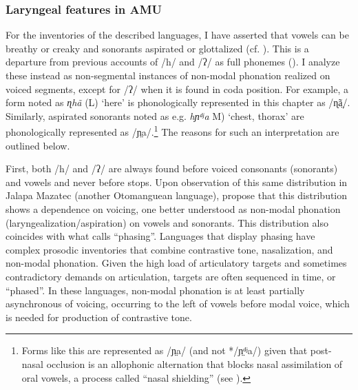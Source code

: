 \documentclass[output=paper]{langscibook}
\begin{document}
\subsubsection{Laryngeal features in AMU}

For the inventories of the described languages, I have asserted that vowels can be breathy or creaky and sonorants aspirated or glottalized (cf. ). This is a departure from previous accounts of /h/ and /ʔ/ as full phonemes (\citealt{Bauernschmidt1965,ApóstolPolanco2014}). I analyze these instead as non-segmental instances of non-modal phonation realized on voiced segments, except for /ʔ/ when it is found in coda position. For example, a form noted as \textit{ɳhã} (L) ‘here’ \citep[302]{Bauernschmidt2010} is phonologically represented in this chapter as /ɳã̤/. Similarly, aspirated sonorants noted as e.g. \textit{hɲᵈʲa} M) ‘chest, thorax’ \citep[127]{Bauernschmidt2010} are phonologically represented as /ɲ̤a/.\footnote{Forms like this are represented as /ɲ̤a/ (and not */ɲ̤ᵈʲa/) given that post-nasal occlusion is an allophonic alternation that blocks nasal assimilation of oral vowels, a process called “nasal shielding” (see \citealt{Dobui2021}).} The reasons for such an interpretation are outlined below.

First, both /h/ and /ʔ/ are always found before voiced consonants (sonorants) and vowels and never before stops. Upon observation of this same distribution in Jalapa Mazatec (another Otomanguean language), \citet{GolstonKehrein1998} propose that this distribution shows a dependence on voicing, one better understood as non-modal phonation (laryngealization\slash aspiration) on vowels and sonorants. This distribution also coincides with what \citet{Silverman1997b} calls “phasing”. Languages that display phasing have complex prosodic inventories that combine contrastive tone, nasalization, and non-modal phonation. Given the high load of articulatory targets and sometimes contradictory demands on articulation, targets are often sequenced in time, or “phased”. In these languages, non-modal phonation is at least partially asynchronous of voicing, occurring to the left of vowels before modal voice, which is needed for production of contrastive tone. 
\end{document}
